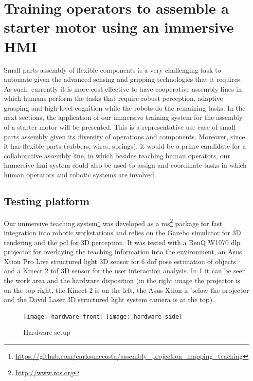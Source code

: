 \section{Training operators to assemble a starter motor using an immersive HMI}\label{sec:training}

Small parts assembly of flexible components is a very challenging task to automate given the advanced sensing and gripping technologies that it requires. As such, currently it is more cost effective to have cooperative assembly lines in which humans perform the tasks that require robust perception, adaptive grasping and high-level cognition while the robots do the remaining tasks. In the next sections, the application of our immersive training system for the assembly of a starter motor will be presented. This is a representative use case of small parts assembly given its diversity of operations and components. Moreover, since it has flexible parts (rubbers, wires, springs), it would be a prime candidate for a collaborative assembly line, in which besides teaching human operators, our immersive \gls{hmi} system could also be used to assign and coordinate tasks in which human operators and robotic systems are involved.


\subsection{Testing platform}

Our immersive teaching system\footnote{\url{https://github.com/carlosmccosta/assembly_projection_mapping_teaching}} was developed as a \gls{ros}\footnote{\url{http://www.ros.org}} package for fast integration into robotic workstations and relies on the Gazebo simulator for 3D rendering and the \gls{pcl} for 3D perception. It was tested with a BenQ W1070 \gls{dlp} projector for overlaying the teaching information into the environment, an Asus Xtion Pro Live structured light 3D sensor for 6 \gls{dof} pose estimation of objects and a Kinect 2 \gls{tof} 3D sensor for the user interaction analysis. In \cref{fig:hardware} it can be seen the work area and the hardware disposition (in the right image the projector is on the top right, the Kinect 2 is on the left, the Asus Xtion is below the projector and the David Laser 3D structured light system camera is at the top).

\begin{figure}[ht]
	\centering
	\texttt{[image: hardware-front]}
	\hspace{2em}
	\texttt{[image: hardware-side]}
	\caption{Hardware setup}
	\label{fig:hardware}
	\vspace{-0.5em}
\end{figure}
\vspace{-0.5em}



